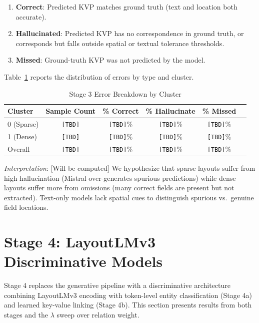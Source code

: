 \begin{enumerate}
    \item \textbf{Correct}: Predicted KVP matches ground truth (text and location both accurate).
    
    \item \textbf{Hallucinated}: Predicted KVP has no correspondence in ground truth, or corresponds but falls outside spatial or textual tolerance thresholds.
    
    \item \textbf{Missed}: Ground-truth KVP was not predicted by the model.
\end{enumerate}

Table~\ref{tab:stage3_error_breakdown} reports the distribution of errors by type and cluster.

\begin{table}[ht]
\centering
\caption{Stage 3 Error Breakdown by Cluster}
\label{tab:stage3_error_breakdown}
\begin{tabular}{@{}lccccc@{}}
\toprule
\textbf{Cluster} & \textbf{Sample Count} & \textbf{\% Correct} & \textbf{\% Hallucinate} & \textbf{\% Missed} \\
\midrule
0 (Sparse) & \texttt{[TBD]} & \texttt{[TBD]}\% & \texttt{[TBD]}\% & \texttt{[TBD]}\% \\
1 (Dense) & \texttt{[TBD]} & \texttt{[TBD]}\% & \texttt{[TBD]}\% & \texttt{[TBD]}\% \\
\midrule
Overall & \texttt{[TBD]} & \texttt{[TBD]}\% & \texttt{[TBD]}\% & \texttt{[TBD]}\% \\
\bottomrule
\end{tabular}
\end{table}

\textit{Interpretation}: [Will be computed] We hypothesize that sparse layouts suffer from high hallucination (Mistral over-generates spurious predictions) while dense layouts suffer more from omissions (many correct fields are present but not extracted). Text-only models lack spatial cues to distinguish spurious vs.\ genuine field locations.

\section{Stage 4: LayoutLMv3 Discriminative Models}
\label{sec:results_stage4}

Stage 4 replaces the generative pipeline with a discriminative architecture combining LayoutLMv3 encoding with token-level entity classification (Stage 4a) and learned key-value linking (Stage 4b). This section presents results from both stages and the $\lambda$ sweep over relation weight.

